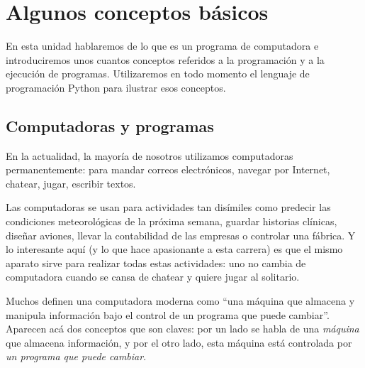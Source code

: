 
%

\chapter[Conceptos básicos]{Algunos conceptos básicos}

En esta unidad hablaremos de lo que es un programa de
computadora e introduciremos unos cuantos conceptos referidos a la
programación y a la ejecución de programas. Utilizaremos en todo
momento el lenguaje de programación Python para ilustrar esos
conceptos.

\section{Computadoras y programas}

En la actualidad, la mayoría de nosotros utilizamos computadoras
permanentemente: para mandar correos electrónicos, navegar por Internet,
chatear, jugar, escribir textos.

Las computadoras se usan para actividades tan disímiles como predecir las
condiciones meteorológicas de la próxima semana, guardar historias clínicas,
diseñar aviones, llevar la contabilidad de las empresas o controlar una
fábrica. Y lo interesante aquí (y lo que hace apasionante a esta carrera) es
que el mismo aparato sirve para realizar todas estas actividades: uno no
cambia de computadora cuando se cansa de chatear y quiere jugar al solitario.

Muchos definen una computadora moderna como ``una máquina que
almacena y manipula información bajo el control de un programa que
puede cambiar''. Aparecen acá dos conceptos que son claves: por un
lado se habla de una {\it máquina} que almacena información, y por
el otro lado, esta máquina está controlada por {\it un programa
que puede cambiar}.

